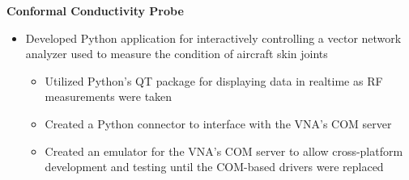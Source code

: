 \documentclass[a4paper]{article}
\begin{document}
\noindent
\hspace{0.120in}
\textbf{Conformal Conductivity Probe}
\smallskip

\begin{itemize}
  \item Developed Python application for interactively controlling a vector network
    analyzer used to measure the condition of aircraft skin joints
  \begin{itemize}
    \item Utilized Python's QT package for displaying data in realtime as RF
      measurements were taken
    \item Created a Python connector to interface with the VNA's COM server
    \item Created an emulator for the VNA's COM server to allow cross-platform
      development and testing until the COM-based drivers were replaced
  \end{itemize}
\end{itemize}

\end{document}
